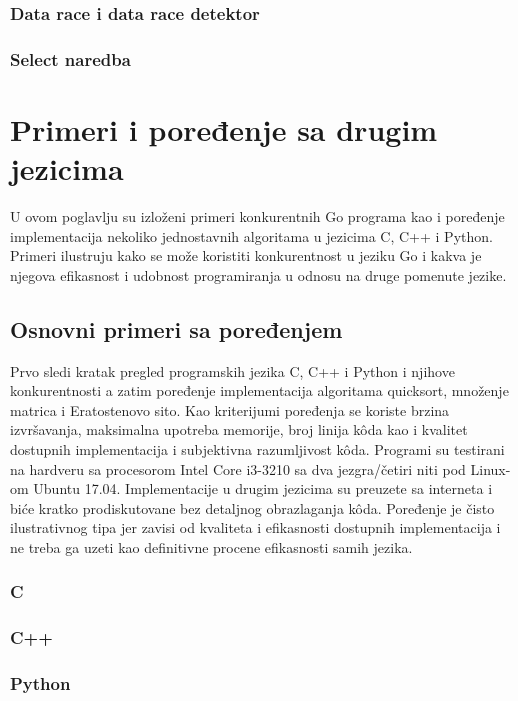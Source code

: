 \documentclass[12pt,oneside]{memoir}
\begin{document}
\subsection{Data race i data race detektor}

\subsection{Select naredba}


\chapter {Primeri i poređenje sa drugim jezicima}
U ovom poglavlju su izloženi primeri konkurentnih Go programa kao i poređenje implementacija nekoliko jednostavnih algoritama u jezicima C, C++ i Python. Primeri ilustruju kako se može koristiti konkurentnost u jeziku Go i kakva je njegova efikasnost i udobnost programiranja u odnosu na druge pomenute jezike. 

\section{Osnovni primeri sa poređenjem}
Prvo sledi kratak pregled programskih jezika C, C++ i Python i njihove konkurentnosti a zatim poređenje implementacija algoritama quicksort, množenje matrica i Eratostenovo sito. Kao kriterijumi poređenja se koriste brzina izvršavanja, maksimalna upotreba memorije, broj linija k\^{o}da kao i kvalitet dostupnih implementacija i subjektivna razumljivost  k\^{o}da. Programi su testirani na hardveru sa procesorom Intel Core i3-3210 sa dva jezgra/četiri niti pod Linux-om Ubuntu 17.04.  Implementacije u drugim jezicima su preuzete sa interneta i biće kratko prodiskutovane bez detaljnog obrazlaganja k\^{o}da. Poređenje je čisto ilustrativnog tipa jer zavisi od kvaliteta i efikasnosti dostupnih implementacija i ne treba ga uzeti kao definitivne procene efikasnosti samih jezika. 

\subsection{C}

\subsection{C++}

\subsection{Python}
\end{document}
